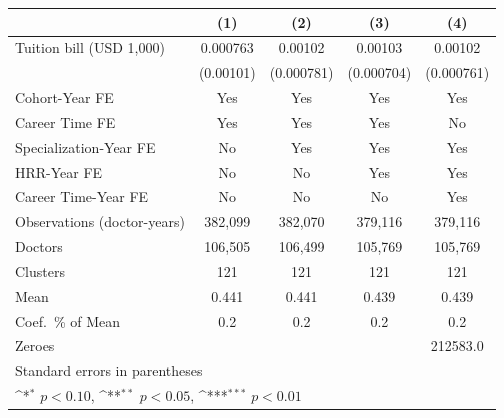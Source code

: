 {
\def\sym#1{\ifmmode^{#1}\else\(^{#1}\)\fi}
\begin{tabular}{l*{4}{c}}
\hline\hline
                    &\multicolumn{1}{c}{(1)}         &\multicolumn{1}{c}{(2)}         &\multicolumn{1}{c}{(3)}         &\multicolumn{1}{c}{(4)}         \\
\hline
Tuition bill (USD 1,000)&    0.000763         &     0.00102         &     0.00103         &     0.00102         \\
                    &   (0.00101)         &  (0.000781)         &  (0.000704)         &  (0.000761)         \\
[1em]
Cohort-Year FE      &         Yes         &         Yes         &         Yes         &         Yes         \\
[1em]
Career Time FE      &         Yes         &         Yes         &         Yes         &          No         \\
[1em]
Specialization-Year FE&          No         &         Yes         &         Yes         &         Yes         \\
[1em]
HRR-Year FE         &          No         &          No         &         Yes         &         Yes         \\
[1em]
Career Time-Year FE &          No         &          No         &          No         &         Yes         \\
\hline
Observations (doctor-years)&     382,099         &     382,070         &     379,116         &     379,116         \\
Doctors             &     106,505         &     106,499         &     105,769         &     105,769         \\
Clusters            &         121         &         121         &         121         &         121         \\
Mean                &       0.441         &       0.441         &       0.439         &       0.439         \\
Coef.\ \% of Mean   &         0.2         &         0.2         &         0.2         &         0.2         \\
Zeroes              &                     &                     &                     &    212583.0         \\
\hline\hline
\multicolumn{5}{l}{\footnotesize Standard errors in parentheses}\\
\multicolumn{5}{l}{\footnotesize \sym{*} \(p<0.10\), \sym{**} \(p<0.05\), \sym{***} \(p<0.01\)}\\
\end{tabular}
}
